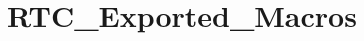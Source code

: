 \hypertarget{group__RTC__Exported__Macros}{
\section{RTC\_\-Exported\_\-Macros}
\label{group__RTC__Exported__Macros}
}
